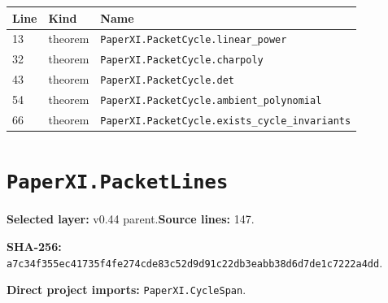 \documentclass[10pt,oneside]{book}
\begin{document}
\begin{longtable}{@{}p{}p{}p{}@{}}\toprule Line&Kind&Name\\\midrule\endhead

13&theorem&\nolinkurl{PaperXI.PacketCycle.linear_power}\\

32&theorem&\nolinkurl{PaperXI.PacketCycle.charpoly}\\

43&theorem&\nolinkurl{PaperXI.PacketCycle.det}\\

54&theorem&\nolinkurl{PaperXI.PacketCycle.ambient_polynomial}\\

66&theorem&\nolinkurl{PaperXI.PacketCycle.exists_cycle_invariants}\\

\bottomrule\end{longtable}

\section{\texorpdfstring{\nolinkurl{PaperXI.PacketLines}}{PaperXI.PacketLines}}\label{module:PaperXI.PacketLines}

\textbf{Selected layer:} v0.44 parent.\quad\textbf{Source lines:} 147.\par\textbf{SHA-256:} {\scriptsize\nolinkurl{a7c34f355ec41735f4fe274cde83c52d9d91c22db3eabb38d6d7de1c7222a4dd}}.


\textbf{Direct project imports:} \nolinkurl{PaperXI.CycleSpan}.
\end{document}
